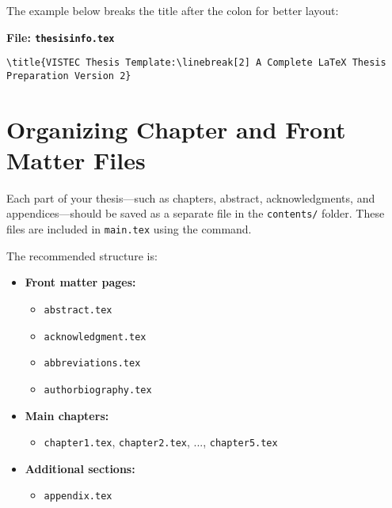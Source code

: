 \documentclass{VISTEC}
\begin{document}
\begin{paragraph}
The example below breaks the title after the colon for better layout:
\end{paragraph}

\noindent\textbf{File: \texttt{thesisinfo.tex}}\vspace{-1.5em}
\begin{verbatim}
\title{VISTEC Thesis Template:\linebreak[2] A Complete LaTeX Thesis Preparation Version 2}
\end{verbatim}


\section{Organizing Chapter and Front Matter Files}
\label{manual:chapters}

\begin{paragraph}
Each part of your thesis—such as chapters, abstract, acknowledgments, and appendices—should be saved as a separate file in the \texttt{contents/} folder. These files are included in \texttt{main.tex} using the \verb|| command.
\end{paragraph}

\begin{paragraph}
The recommended structure is:
\end{paragraph}

\begin{itemize}[leftmargin=\paritemindent]
    \item \textbf{Front matter pages:}
    \begin{itemize}[leftmargin=0.5cm]
        \item \texttt{abstract.tex}
        \item \texttt{acknowledgment.tex}
        \item \texttt{abbreviations.tex}
        \item \texttt{authorbiography.tex}
    \end{itemize}
    
    \item \textbf{Main chapters:}
    \begin{itemize}[leftmargin=0.5cm]
        \item \texttt{chapter1.tex}, \texttt{chapter2.tex}, ..., \texttt{chapter5.tex}
    \end{itemize}
    
    \item \textbf{Additional sections:}
    \begin{itemize}[leftmargin=0.5cm]
        \item \texttt{appendix.tex}
    \end{itemize}
\end{itemize}
\end{document}
